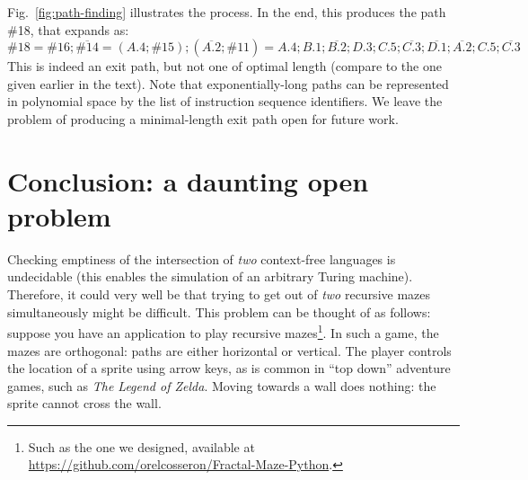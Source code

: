 \documentclass[a4paper,UKenglish,cleveref, autoref]{lipics-v2021}
\begin{document}
Fig.~\ref{fig:path-finding} illustrates the process. In the end, this produces the path \#18, that expands as:
\[
  \#18 = \# 16; \overline{\#14} = (A.4; \#15); (\overline{A.2}; \#11) = A.4; B.1; \overline{B.2}; D.3; C.5; \overline{C.3}; \overline{D.1}; \overline{A.2}; C.5; \overline{C.3}
\]
This is indeed an exit path, but not one of optimal length (compare to the one
given earlier in the text). Note that exponentially-long paths can be
represented in polynomial space by the list of instruction sequence identifiers.
We leave the problem of producing a minimal-length exit path open for future work.




\section{Conclusion: a daunting open problem}

Checking emptiness of the intersection of \emph{two} context-free
languages is undecidable (this enables the simulation of an arbitrary Turing
machine). Therefore, it could very well be that trying to get out of \emph{two}
recursive mazes simultaneously might be difficult. This problem can be thought
of as follows: suppose you have an application to play recursive mazes\footnote{
Such as the one we designed, available at
  \url{https://github.com/orelcosseron/Fractal-Maze-Python}.}. In
such a game, the mazes are orthogonal: paths are either horizontal or
vertical. The player controls the location of a sprite using arrow keys, as is
common in ``top down'' adventure games, such as \emph{The Legend of
  Zelda}. Moving towards a wall does nothing: the sprite cannot cross the
wall.
\end{document}
